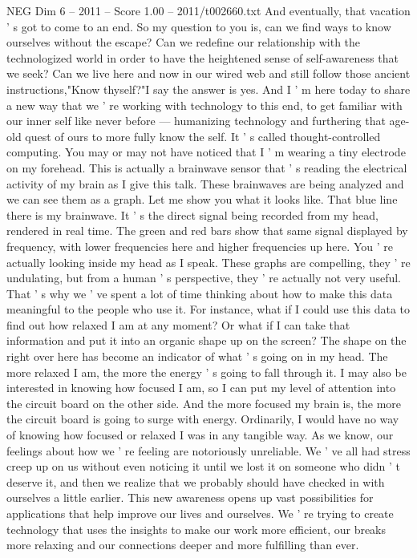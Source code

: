 \begin{textsample}{NEG Dim 6 – 2011 – Score 1.00 – 2011/t002660.txt}
And eventually, that vacation ' s got to come to an end.
So my question to you is, can we find ways to know ourselves without the escape?
Can we redefine our relationship with the technologized world in order to have the heightened sense of self-awareness that we seek?
Can we live here and now in our wired web and still follow those ancient instructions,"Know thyself?"I say the answer is yes.
And I ' m here today to share a new way that we ' re working with technology to this end, to get familiar with our inner self like never before — humanizing technology and furthering that age-old quest of ours to more fully know the self.
It ' s called thought-controlled computing.
You may or may not have noticed that I ' m wearing a tiny electrode on my forehead.
This is actually a brainwave sensor that ' s reading the electrical activity of my brain as I give this talk.
These brainwaves are being analyzed and we can see them as a graph.
Let me show you what it looks like.
That blue line there is my brainwave.
It ' s the direct signal being recorded from my head, rendered in real time.
The green and red bars show that same signal displayed by frequency, with lower frequencies here and higher frequencies up here.
You ' re actually looking inside my head as I speak.
These graphs are compelling, they ' re undulating, but from a human ' s perspective, they ' re actually not very useful.
That ' s why we ' ve spent a lot of time thinking about how to make this data meaningful to the people who use it.
For instance, what if I could use this data to find out how relaxed I am at any moment?
Or what if I can take that information and put it into an organic shape up on the screen?
The shape on the right over here has become an indicator of what ' s going on in my head.
The more relaxed I am, the more the energy ' s going to fall through it.
I may also be interested in knowing how focused I am, so I can put my level of attention into the circuit board on the other side.
And the more focused my brain is, the more the circuit board is going to surge with energy.
Ordinarily, I would have no way of knowing how focused or relaxed I was in any tangible way.
As we know, our feelings about how we ' re feeling are notoriously unreliable.
We ' ve all had stress creep up on us without even noticing it until we lost it on someone who didn ' t deserve it, and then we realize that we probably should have checked in with ourselves a little earlier.
This new awareness opens up vast possibilities for applications that help improve our lives and ourselves.
We ' re trying to create technology that uses the insights to make our work more efficient, our breaks more relaxing and our connections deeper and more fulfilling than ever.

\end{textsample}
